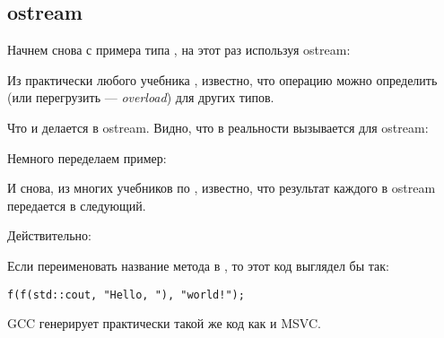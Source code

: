 \subsection{ostream}

Начнем снова с примера типа , на этот раз используя ostream:



Из практически любого учебника \Cpp, известно, что операцию \TT{<<} можно определить 
(или перегрузить --- \emph{overload}) для других типов.

Что и делается в ostream.
Видно, что в реальности вызывается  для ostream:



Немного переделаем пример:



И снова, из многих учебников по \Cpp, известно, что результат каждого  
в ostream передается в следующий.

Действительно:



Если переименовать название метода  в \ttf{}, то этот код выглядел бы так:

\begin{lstlisting}[style=customc]
f(f(std::cout, "Hello, "), "world!");
\end{lstlisting}

GCC генерирует практически такой же код как и MSVC.

